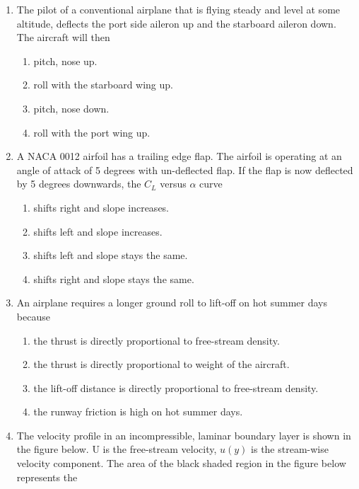 \documentclass[journal,12pt,onecolumn]{IEEEtran}
\theoremstyle{remark}
\begin{document}
\begin{enumerate}
    \item The pilot of a conventional airplane that is flying steady and level at some altitude, deflects the port side aileron up and the starboard aileron down. The aircraft will then
    \hfill{}

    \begin{enumerate}
        \item pitch, nose up.
        \item roll with the starboard wing up.
        \item pitch, nose down.
        \item roll with the port wing up.
    \end{enumerate}

    \item A NACA 0012 airfoil has a trailing edge flap. The airfoil is operating at an angle of attack of 5 degrees with un-deflected flap. If the flap is now deflected by 5 degrees downwards, the $C_{L}$ versus $\alpha$ curve
    \hfill{}

    \begin{enumerate}
        \item shifts right and slope increases.
        \item shifts left and slope increases.
        \item shifts left and slope stays the same.
        \item shifts right and slope stays the same.
    \end{enumerate}

    \item An airplane requires a longer ground roll to lift-off on hot summer days because
    \hfill{}

    \begin{enumerate}
        \item the thrust is directly proportional to free-stream density.
        \item the thrust is directly proportional to weight of the aircraft.
        \item the lift-off distance is directly proportional to free-stream density.
        \item the runway friction is high on hot summer days.
    \end{enumerate}

    \item The velocity profile in an incompressible, laminar boundary layer is shown in the figure below. U is the free-stream velocity, $u(y)$ is the stream-wise velocity component. The area of the black shaded region in the figure below represents the
    \hfill{}
    

\end{enumerate}
\end{document}
